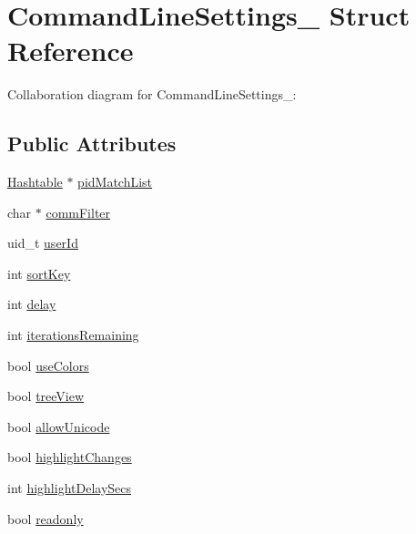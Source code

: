 \hypertarget{structCommandLineSettings__}{}\section{Command\+Line\+Settings\+\_\+ Struct Reference}
\label{structCommandLineSettings__}


Collaboration diagram for Command\+Line\+Settings\+\_\+\+:
\subsection*{Public Attributes}
\begin{DoxyCompactItemize}
\item 
\hyperlink{Hashtable_8h_af67f943dab16c5d7d465c18053edf47f}{Hashtable} $\ast$ \hyperlink{structCommandLineSettings___aa0fe8d07c69db62fc832534436ba17aa}{pid\+Match\+List}
\item 
char $\ast$ \hyperlink{structCommandLineSettings___abedf7d8444e9cb172952b2d78554cc6c}{comm\+Filter}
\item 
uid\+\_\+t \hyperlink{structCommandLineSettings___a4b4538cce9114311f25893a5447198c3}{user\+Id}
\item 
int \hyperlink{structCommandLineSettings___ae00a5baae31603d462d25278ddaf509d}{sort\+Key}
\item 
int \hyperlink{structCommandLineSettings___abb824ab11b1597e92624390eec548d5c}{delay}
\item 
int \hyperlink{structCommandLineSettings___a6acc50c52a09d4d1dacb285d2d1a10b3}{iterations\+Remaining}
\item 
bool \hyperlink{structCommandLineSettings___a02dbea155098b07c9ab066e77255ba71}{use\+Colors}
\item 
bool \hyperlink{structCommandLineSettings___a769ec10b5d241efcbe0e8a873fdf2586}{tree\+View}
\item 
bool \hyperlink{structCommandLineSettings___ab5715a18b170e660fc1ee0a2809bea0e}{allow\+Unicode}
\item 
bool \hyperlink{structCommandLineSettings___a685e65b5e24becf7385d16aed2a7989c}{highlight\+Changes}
\item 
int \hyperlink{structCommandLineSettings___a84d0c8d36cfc4585f1358a51623c3e64}{highlight\+Delay\+Secs}
\item 
bool \hyperlink{structCommandLineSettings___a00ca93a974c7875adfa5febecb7dcf0e}{readonly}
\end{DoxyCompactItemize}


